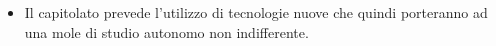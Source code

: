 \begin{itemize}

\item Il capitolato prevede l'utilizzo di tecnologie nuove che quindi porteranno ad una mole di studio autonomo non indifferente.

\end{itemize}